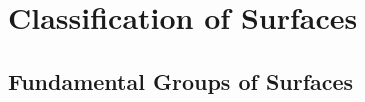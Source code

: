 \newpage

\section{Classification of Surfaces}

\setcounter{subsection}{73}
\subsection{Fundamental Groups of Surfaces}


